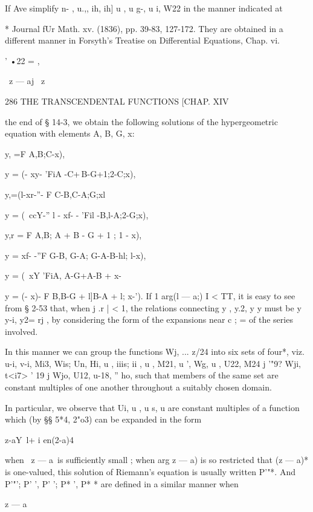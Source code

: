 If Ave simplify n- , u.,, ih, ih] u , u g-, u i, W22 in the manner indicated at 

* Journal fUr Math. xv. (1836), pp. 39-83, 127-172. They are obtained in a different manner 
in Forsyth's Treatise on Differential Equations, Chap. vi. 



' •22 = , 

\ z — aj \ z 



286 THE TRANSCENDENTAL FUNCTIONS [CHAP. XIV 

the end of § 14-3, we obtain the following solutions of the hypergeometric 
equation with elements A, B, G, x: 

y, =F A,B;C-x), 

y  = (- xy- 'FiA -C+\,B-G+1;2-C;x), 

y,=(l-xr-''- F C-B,C-A;G;xl 

y  = (\  ccY-'' l - xf- - 'Fil -B,l-A;2-G;x), 

y,r = F A,B; A + B - G + 1 ; 1 - x), 

y  =   xf- -''F G-B, G-A; G-A-B-hl; l-x), 

y  = (\  xY 'FiA, A-G+\;A-B + \; x-%

y  = (- x)-  F B,B-G + l]B-A + l; x-'). 
If 1 arg(l — a;) I < TT, it is easy to see from § 2-53 that, when j .r | < 1, the 
relations connecting y , y.2, y  y  must be y y-i, y2= rj , by considering the 
form of the expansions near c ; = of the series involved. 

In this manner we can group the functions Wj, ... z/24 into six sets of four*, 
viz. u-i, v-i, Mi3, Wis; Un, Hi, u , iiis; ii , u , M21, u ', Wg, u , U22, M24 j '"9? Wji, t<i7> ' 19 j 
Wjo, U12, u-18, '' ho, such that members of the same set are constant multiples of 
one another throughout a suitably chosen domain. 

In particular, we observe that Ui, u , u s, u  are constant multiples of a 
function which (by §§ 5*4, 2"o3) can be expanded in the form 



 z-aY\ l+ i en(2-a)4 



when \ z — a\ is sufficiently small ; when arg  z — a) is so restricted that 
(z — a)* is one-valued, this solution of Riemann's equation is usually written 
P'"*. And P'"'; P' ', P' '; P* ', P* * are defined in a similar manner when 



z — a 



